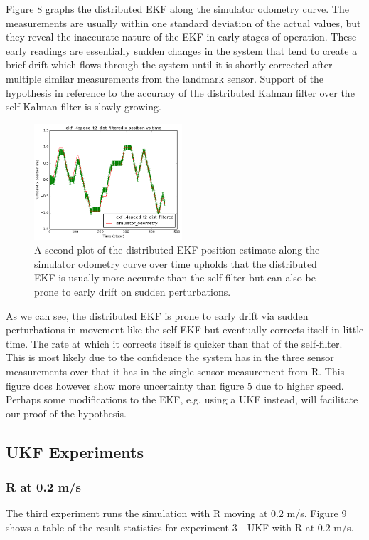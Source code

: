 \documentclass[conference]{IEEEtran} \usepackage[T1]{fontenc} \usepackage[backend=biber, style=ieee]{biblatex}
\begin{document}
Figure 8 graphs the distributed EKF along the simulator odometry curve. The measurements are usually within one standard 
deviation of the actual values, but they reveal the inaccurate nature of the EKF in early stages of operation. These early readings 
are essentially sudden changes in the system that tend to create a brief drift which flows through the system until it is shortly 
corrected after multiple similar measurements from the landmark sensor. Support of the hypothesis in reference to the accuracy 
of the distributed Kalman filter over the self Kalman filter is slowly growing.

\begin{figure}
\centering 
\includegraphics[width=0.49\textwidth]{ekf_4speed_t2_dist_filtered_pos_err_graph}
\caption {A second plot of the distributed EKF position estimate along the simulator odometry curve over time 
upholds that the distributed EKF is usually more accurate than the self-filter but can also be prone to early drift on sudden 
perturbations.}
\label{pic8} 
\end{figure}

As we can see, the distributed EKF is prone to early drift via sudden perturbations in movement like the self-EKF but 
eventually corrects itself in little time. The rate at which it corrects itself is quicker than that of the self-filter. 
This is most likely due to the confidence the system has in the three sensor measurements over that it has in the single 
sensor measurement from R. This figure does however show more uncertainty than figure 5 due to higher speed. Perhaps some 
modifications to the EKF, e.g. using a UKF instead, will facilitate our proof of the hypothesis.

\subsection{UKF Experiments} \label{UKF Experiments}
\subsubsection{R at 0.2 m/s} \label{UKF .2}
The third experiment runs the simulation with R moving at 0.2 m/s. Figure 9 shows a table of the result statistics for experiment 3 - UKF 
with R at 0.2 m/s. 
\end{document}
